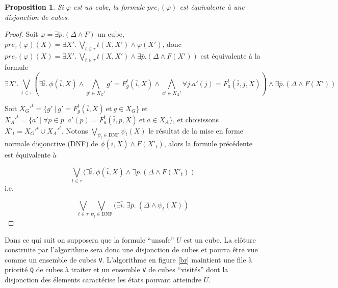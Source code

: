 \documentclass[a4paper, twoside]{scrartcl}
\theoremstyle{plain}%
\newtheorem{prop}[thm]{Proposition}
\theoremstyle{definition}
\theoremstyle{remark}
\begin{document}
\begin{prop} \label{pre_cube}
  Si $\varphi$ est un cube, la formule $pre_\tau(\varphi)$ est
  équivalente à une disjonction de cubes.
\end{prop}


\begin{proof}
  Soit $\varphi = \exists \bar p. (\Delta \land F)$ un cube,
  $pre_\tau(\varphi)(X) = \exists X'.~ \bigvee_{t \in \tau} t(X,X')
  \wedge \varphi(X') $, donc $pre_\tau(\varphi)(X) = \exists X'.~
  \bigvee_{t \in \tau} t(X,X') \wedge \exists \bar p. (\Delta \land
  F(X')) $ est équivalente à la formule
  \[\exists X'.~ \bigvee_{t \in \tau} (\exists \bar{i}.~\phi(\bar{i}, X) \wedge 
  \bigwedge_{g' \in X_G'} g' = F_g^t(\bar{i},X) \wedge
  \bigwedge_{a' \in X_A'} \forall j. a'(j) = F_a^t(\bar{i},j,X))
  \wedge \exists \bar p. (\Delta \land F(X')) \]

  Soit $X_G'^t = \{ g' ~|~ g' = F_g^t(\bar{i},X) ~\text{et}~ g \in X_G \}$
  et $X_A'^t = \{ a' ~|~ \forall p \in \bar p.~ a'(p) = F_a^t(\bar{i},p,X)
  ~\text{et}~ a \in X_A \}$, et choisissons $X'_t = X_G'^t \cup
  X_A'^t$. Notons $\bigvee_{\psi_t \in \text{DNF}}\psi_t(X)$ le résultat de la mise
  en forme normale disjonctive (DNF) de $\phi(\bar{i}, X) \wedge F(X'_t)$,
  alors la formule précédente est équivalente à

  \[\bigvee_{t \in \tau} (\exists \bar{i}.~\phi(\bar{i}, X)
  \wedge \exists \bar p. (\Delta \land F(X'_t)) \] i.e.

  \[\bigvee_{t \in \tau} \bigvee_{\psi_t \in \text{DNF}} (\exists
  \bar{i}.~\exists \bar p.~ (\Delta \land \psi_t(X))\]
\end{proof}

Dans ce qui suit on supposera que la formule ``unsafe'' $U$ est un
cube. La clôture construite par l'algorithme sera donc une disjonction
de cubes et pourra être vue comme un ensemble de cubes \texttt{V}.
L'algorithme en figure \ref{br} maintient une file à priorité
\texttt{Q} de cubes à traiter et un ensemble \texttt{V} de cubes
``visités'' dont la disjonction des élements caractérise les états
pouvant atteindre $U$.
\end{document}
